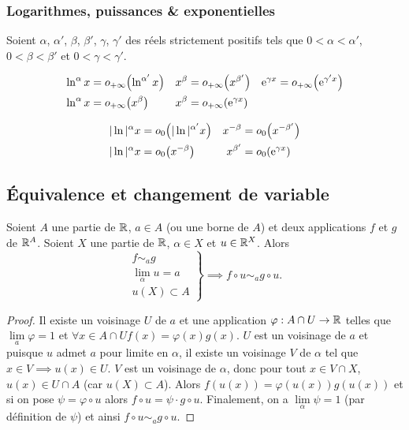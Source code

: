 \subsubsection{Logarithmes, puissances \& exponentielles}

Soient \(\alpha\), \(\alpha'\), \(\beta\), \(\beta'\), \(\gamma\), \(\gamma'\) des réels strictement positifs tels que \(0 < \alpha < \alpha'\), \(0 < \beta < \beta'\) et \(0 < \gamma < \gamma'\).
\begin{prop}
  \begin{align}
    \ln^\alpha x &= o\mathopen{}_{+\infty}\left(\ln^{\alpha'} x\right) & x^\beta &= o\mathopen{}_{+\infty}\left(x^{\beta'}\right)& \operatorname{e}^{\gamma x} = o\mathopen{}_{+\infty}\left(\operatorname{e}^{\gamma' x}\right) \\
    \ln^\alpha x &= o\mathopen{}_{+\infty}\left(x^\beta\right) & x^\beta &= o\mathopen{}_{+\infty}\left(\operatorname{e}^{\gamma x}\right)
  \end{align}
\end{prop}
\begin{prop}
  \begin{align}
    |\ln|^\alpha x &= o\mathopen{}_{0}\left(|\ln|^{\alpha'} x\right) & x^{-\beta} &= o\mathopen{}_{0}\left(x^{-\beta'}\right) \\
    |\ln|^\alpha x &= o\mathopen{}_{0}\left(x^{-\beta}\right) & x^{\beta'} &= o\mathopen{}_{0}\left(\operatorname{e}^{\gamma x}\right)
  \end{align}
\end{prop}

\subsection{Équivalence et changement de variable}

\begin{theo}
  Soient \(A\) une partie de \(\mathbb{R}\), \(a \in A\) (ou une borne de \(A\)) et deux applications \(f\) et \(g\) de \(\mathbb{R}^A\). Soient \(X\) une partie de \(\mathbb{R}\), \(\alpha \in X\) et \(u \in \mathbb{R}^X\). Alors
  \begin{equation}
    \left.
    \begin{array}{l}
      f \sim_a g \\ \lim\limits_{\alpha}u=a \\ u(X) \subset A
    \end{array}
    \right \}
    \implies f\circ u \sim_a g \circ u.
  \end{equation}
\end{theo}
\begin{proof}
  Il existe un voisinage \(U\) de \(a\) et une application \(\varphi : A \cap U \rightarrow \mathbb{R}\) telles que \(\lim\limits_{a} \varphi =1\) et \(\forall x \in A \cap U f(x)=\varphi(x) g(x)\). \(U\) est un voisinage de \(a\) et puisque \(u\) admet \(a\) pour limite en \(\alpha\), il existe un voisinage \(V\) de \(\alpha\) tel que \(x \in V \implies u(x) \in U\). \(V\) est un voisinage de \(\alpha\), donc pour tout \(x \in V \cap X\), \(u(x) \in U \cap A\) (car \(u(X) \subset A\)). Alors \(f(u(x))=\varphi(u(x))g(u(x))\) et si on pose \(\psi = \varphi \circ u\) alors \(f \circ u = \psi \cdot g \circ u\). Finalement, on a \(\lim\limits_{\alpha} \psi =1\) (par définition de \(\psi\)) et ainsi \(f\circ u \sim_a g \circ u\).
\end{proof}

